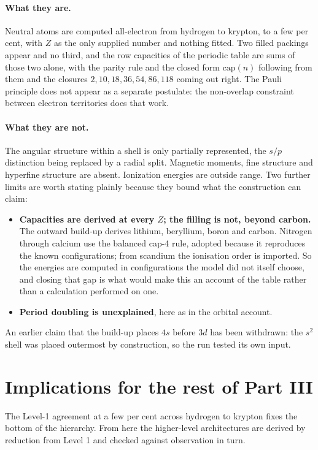 \paragraph{What they are.}
Neutral atoms are computed all-electron from hydrogen to krypton, to a few per cent, with $Z$ as
the only supplied number and nothing fitted. Two filled packings appear and no third, and the row
capacities of the periodic table are sums of those two alone, with the parity rule and the closed
form $\mathrm{cap}(n)$ following from them and the closures $2,10,18,36,54,86,118$ coming out
right. The Pauli principle does not appear as a separate postulate: the non-overlap constraint
between electron territories does that work.

\paragraph{What they are not.}
The angular structure within a shell is only partially represented, the $s/p$ distinction being
replaced by a radial split. Magnetic moments, fine structure and hyperfine structure are absent.
Ionization energies are outside range. Two further limits are worth stating plainly because they
bound what the construction can claim:
\begin{itemize}
\item \textbf{Capacities are derived at every $Z$; the filling is not, beyond carbon.} The
outward build-up derives lithium, beryllium, boron and carbon. Nitrogen through calcium use the
balanced cap-4 rule, adopted because it reproduces the known configurations; from scandium the
ionisation order is imported. So the energies are computed in configurations the model did not
itself choose, and closing that gap is what would make this an account of the table rather than a
calculation performed on one.
\item \textbf{Period doubling is unexplained}, here as in the orbital account.
\end{itemize}
An earlier claim that the build-up places $4s$ before $3d$ has been withdrawn: the $s^2$ shell was
placed outermost by construction, so the run tested its own input.

\section{Implications for the rest of Part III}\label{sec:to-part-iii}

The Level-1 agreement at a few per cent across hydrogen to krypton fixes the bottom of the
hierarchy. From here the higher-level architectures are derived by reduction from Level 1 and
checked against observation in turn.

